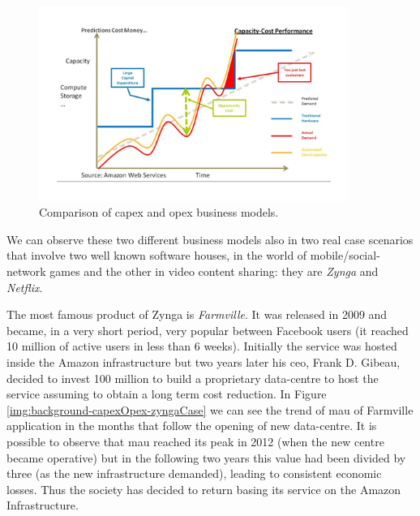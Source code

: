 \begin{figure}
	\centering{}
	\includegraphics[width=0.9\textwidth]{chapters/background/images/capex-opex.png}
	\caption[Comparison between \acs{capex} and \acs{opex} business models]{Comparison of \acf{capex}
		and \acf{opex} business models.}
	\label{img:background-capexOpex-model}
\end{figure}

We can observe these two different business models also in two real case scenarios \cite{netflixZynga}
that involve two well known software houses, in the world of mobile/social-network games and the other
in video content sharing: they are \textit{Zynga} and \textit{Netflix}. 

The most famous product of Zynga is \textit{Farmville}. It was released in 2009 and became, in a very
short period, very popular between Facebook users (it reached 10 million of active users in less than
6 weeks). Initially the service was hosted inside the Amazon infrastructure but two years later his
\acs{ceo}, Frank D. Gibeau, decided to invest \textdollar{}100 million to build a proprietary data-centre
to host the service assuming to obtain a long term cost reduction. In Figure
\ref{img:background-capexOpex-zyngaCase} we can see the trend of \ac{mau} of Farmville application
in the months that follow the opening of new data-centre. It is possible to observe that \ac{mau} reached
its peak in 2012 (when the new centre became operative) but in the following two years this value had
been divided by three (as the new infrastructure demanded), leading to consistent economic losses.
Thus the society has decided to return basing its service on the Amazon Infrastructure.

